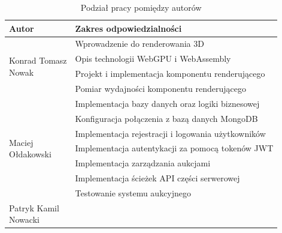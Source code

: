 \begin{table}[H]
  \centering
  \caption{Podział pracy pomiędzy autorów}
  \label{tab:podzial_pracy}
  \begin{tabularx}{\textwidth}{|l|X|}
    \hline
    \textbf{Autor} & \textbf{Zakres odpowiedzialności}                                                           \\
    \hline
    \multirow{4}{*}{\parbox{4cm}{Konrad Tomasz                                                                   \\Nowak}}
                   & Wprowadzenie do renderowania 3D                                                             \\
                   & Opis technologii WebGPU i WebAssembly                                                       \\
                   & Projekt i implementacja komponentu renderującego                                            \\
                   & Pomiar wydajności komponentu renderującego                                                  \\
    \hline
    \multirow{7}{*}{\parbox{4cm}{Maciej                                                                          \\Ołdakowski}}
                   & Implementacja bazy danych oraz logiki biznesowej                                            \\
                   & Konfiguracja połączenia z bazą danych MongoDB                                               \\
                   & Implementacja rejestracji i logowania użytkowników                                          \\
                   & Implementacja autentykacji za pomocą tokenów JWT                                            \\
                   & Implementacja zarządzania aukcjami                                                          \\
                   & Implementacja ścieżek API części serwerowej                                                 \\
                   & Testowanie systemu aukcyjnego                                                               \\
    \hline
    \multirow{6}{*}{\parbox{4cm}{Patryk Kamil                                                                    \\Nowacki}}

\end{tabularx}
\end{table}
